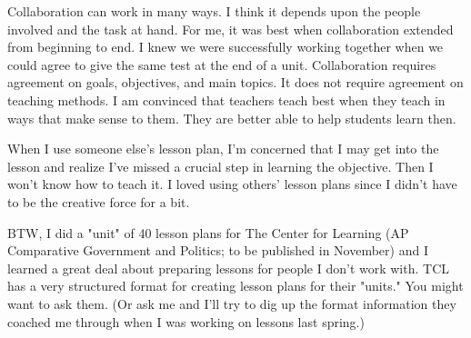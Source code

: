 \documentclass[10pt,letter]{article}
\begin{document}
Collaboration can work in many ways. I think it depends upon the people involved
and the task at hand. For me, it was best when collaboration extended from
beginning to end. I knew we were successfully working together when we could
agree to give the same test at the end of a unit. Collaboration requires
agreement on goals, objectives, and main topics. It does not require agreement
on teaching methods. I am convinced that teachers teach best when they teach in
ways that make sense to them. They are better able to help students learn then.

When I use someone else's lesson plan, I'm concerned that I may get into the
lesson and realize I've missed a crucial step in learning the objective. Then I
won't know how to teach it. I loved using others' lesson plans since I didn't
have to be the creative force for a bit.

BTW, I did a "unit" of 40 lesson plans for The Center for Learning (AP
Comparative Government and Politics; to be published in November) and I learned
a great deal about preparing lessons for people I don't work with. TCL has a
very structured format for creating lesson plans for their "units." You might
want to ask them. (Or ask me and I'll try to dig up the format information they
coached me through when I was working on lessons last spring.)

\pagebreak

\end{document}

